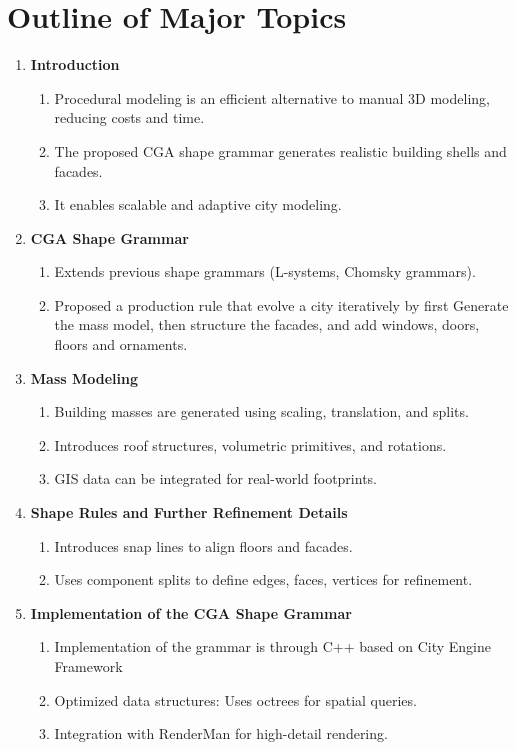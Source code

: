 \documentclass[12pt]{article}
\begin{document}
\section{Outline of Major Topics}
\begin{enumerate}[noitemsep]
    \item \textbf{Introduction}
    \begin{enumerate}[noitemsep]
        \item Procedural modeling is an efficient alternative to manual 3D modeling, reducing costs and time.
        \item The proposed CGA shape grammar generates realistic building shells and facades.
        \item It enables scalable and adaptive city modeling.
    \end{enumerate}
    \item \textbf{CGA Shape Grammar}
    \begin{enumerate}[noitemsep]
        \item Extends previous shape grammars (L-systems, Chomsky grammars).
        \item Proposed a production rule that evolve a city iteratively by first Generate the mass model, then structure the facades, and add windows, doors, floors and ornaments.
    \end{enumerate}
    \item \textbf{Mass Modeling}
    \begin{enumerate}[noitemsep]
        \item Building masses are generated using scaling, translation, and splits.
        \item Introduces roof structures, volumetric primitives, and rotations.
        \item GIS data can be integrated for real-world footprints.
    \end{enumerate}
    \item \textbf{Shape Rules and Further Refinement Details}
    \begin{enumerate}[noitemsep]
        \item Introduces snap lines to align floors and facades.
        \item Uses component splits to define edges, faces, vertices for refinement.
    \end{enumerate}
    \item \textbf{Implementation of the CGA Shape Grammar}
    \begin{enumerate}[noitemsep]
        \item Implementation of the grammar is through C++ based on City Engine Framework
        \item Optimized data structures: Uses octrees for spatial queries.
        \item Integration with RenderMan for high-detail rendering.
    \end{enumerate}
    

\end{enumerate}
\end{document}
